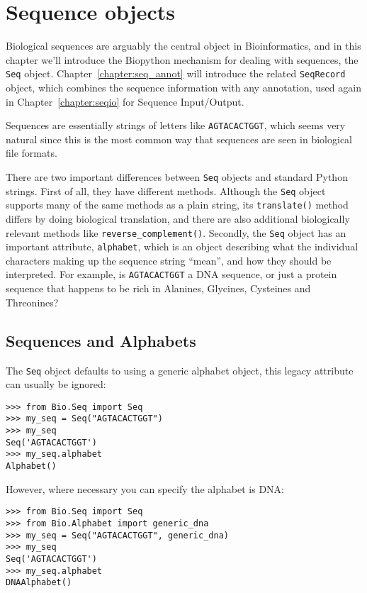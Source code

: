 \chapter{Sequence objects}
\label{chapter:seq_objects}

Biological sequences are arguably the central object in Bioinformatics, and in this chapter we'll introduce the Biopython mechanism for dealing with sequences, the \verb|Seq| object.
Chapter~\ref{chapter:seq_annot} will introduce the related \verb|SeqRecord| object, which combines the sequence information with any annotation, used again in Chapter~\ref{chapter:seqio} for Sequence Input/Output.

Sequences are essentially strings of letters like \verb|AGTACACTGGT|, which seems very natural since this is the most common way that sequences are seen in biological file formats.

There are two important differences between \verb|Seq| objects and standard Python strings.
First of all, they have different methods.  Although the \verb|Seq| object supports many of the same methods as a plain string, its \verb|translate()| method differs by doing biological translation, and there are also additional biologically relevant methods like \verb|reverse_complement()|.
Secondly, the \verb|Seq| object has an important attribute, \verb|alphabet|, which is an object describing what the individual characters making up the sequence string ``mean'', and how they should be interpreted.  For example, is \verb|AGTACACTGGT| a DNA sequence, or just a protein sequence that happens to be rich in Alanines, Glycines, Cysteines
and Threonines?

\section{Sequences and Alphabets}

The \verb|Seq| object defaults to using a generic alphabet object,
this legacy attribute can usually be ignored:

\begin{verbatim}
>>> from Bio.Seq import Seq
>>> my_seq = Seq("AGTACACTGGT")
>>> my_seq
Seq('AGTACACTGGT')
>>> my_seq.alphabet
Alphabet()
\end{verbatim}

However, where necessary you can specify the alphabet is DNA:

\begin{verbatim}
>>> from Bio.Seq import Seq
>>> from Bio.Alphabet import generic_dna
>>> my_seq = Seq("AGTACACTGGT", generic_dna)
>>> my_seq
Seq('AGTACACTGGT')
>>> my_seq.alphabet
DNAAlphabet()
\end{verbatim}

